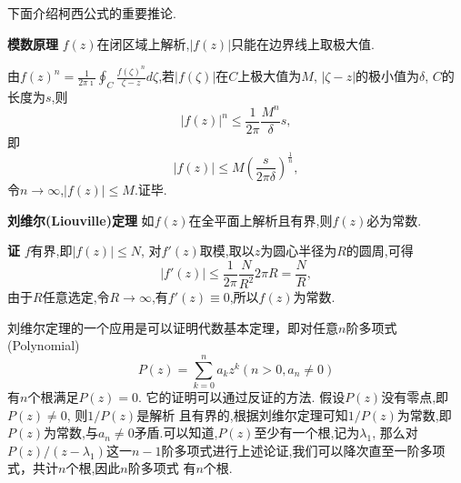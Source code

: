 下面介绍柯西公式的重要推论.

\textbf{模数原理} $f(z)$在闭区域上解析,$|f(z)|$只能在边界线上取极大值.

由$f(z)^n = \frac{1}{2\pi \imath} \oint_C \frac{f(\zeta)^n}{\zeta - z} d \zeta$,若$|f(\zeta)|$在$C$上极大值为$M$,
$|\zeta - z|$的极小值为$\delta$, $C$的长度为$s$,则
\[
  |f(z)|^n \leq \frac{1}{2\pi} \frac{M^n}{\delta} s  ,
\]
即
\[
    |f(z)| \leq M \left( \frac{s}{2\pi \delta} \right)^{\frac{1}{n}},
\]
令$n\to \infty$,$|f(z)| \leq M$.证毕.

\textbf{刘维尔(Liouville)定理} \quad 如$f(z)$在全平面上解析且有界,则$f(z)$必为常数.

\textbf{证} \quad $f$有界,即$|f(z)| \leq N$, 对$f'(z)$取模,取以$z$为圆心半径为$R$的圆周,可得
\[
  |f'(z)| \leq \frac{1}{2\pi} \frac{N} {R^2} 2\pi R = \frac{N}{R},
\]
由于$R$任意选定,令$R\to \infty$,有$f'(z) \equiv 0$,所以$f(z)$为常数.

刘维尔定理的一个应用是可以证明代数基本定理，即对任意$n$阶多项式(Polynomial)
\begin{equation}
    P(z) = \sum_{k=0}^{n} a_k z^k (n>0, a_n \neq 0)
    \label{eq:poly}
\end{equation}
有$n$个根满足$P(z) = 0$. 它的证明可以通过反证的方法. 假设$P(z)$没有零点,即$P(z)\neq 0$, 则$1/P(z)$是解析
且有界的,根据刘维尔定理可知$1/P(z)$为常数,即$P(z)$为常数,与$a_n\neq 0$矛盾.可以知道,$P(z)$至少有一个根,记为$\lambda_1$,
那么对$P(z)/(z-\lambda_1)$这一$n-1$阶多项式进行上述论证,我们可以降次直至一阶多项式，共计$n$个根,因此$n$阶多项式
有$n$个根.
